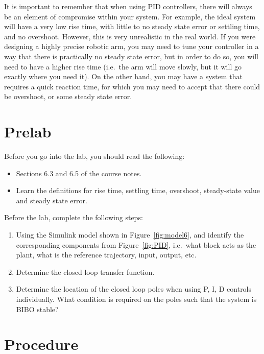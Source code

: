 It is important to remember that when using  PID controllers, there will always be an element of
compromise within your system. For example, the ideal system will have a very low rise time, with
little to no steady state error or settling time, and no overshoot. However, this is very unrealistic in
the real world. If you were designing a highly precise robotic arm, you may need to tune your
controller in a way that there is practically no steady state error, but in order to do so, you will need to
have a higher rise time (i.e.\ the arm will move slowly, but it will go exactly where you need it). On
the other hand, you may have a system that requires a quick reaction time, for which you may need
to accept that there could be overshoot, or some steady state error.
\section{Prelab}

Before you go into the lab, you should read the following:
\begin{itemize}
    \item Sections 6.3 and 6.5 of the course notes.
    \item Learn the definitions for rise time, settling time, overshoot, steady-state value and steady state error.
\end{itemize}
Before the lab, complete the following steps:
\begin{enumerate}
    \item Using the Simulink model shown in Figure~\ref{fig:model6}, and identify
          the corresponding components from Figure~\ref{fig:PID}, i.e.\ what block acts as
          the plant, what is the reference trajectory, input, output, etc.
    \item Determine the closed loop transfer function.
    \item Determine the location of the closed loop poles when using P, I, D controls
          individually. What condition is required on the poles such that the system is BIBO stable?
\end{enumerate}

\section{Procedure}

